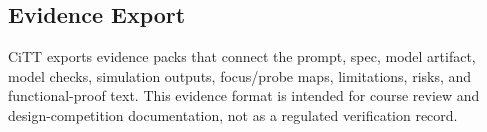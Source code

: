 \subsection{Evidence Export}

CiTT exports evidence packs that connect the prompt, spec, model artifact, model checks, simulation outputs, focus/probe maps, limitations, risks, and functional-proof text. This evidence format is intended for course review and design-competition documentation, not as a regulated verification record.

